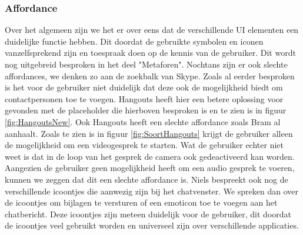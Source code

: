 \documentclass[11pt]{article}
\begin{document}
\subsubsection{Affordance} 
Over het algemeen zijn we het er over eens dat de verschillende UI elementen een duidelijke functie hebben. Dit doordat de gebruikte symbolen en iconen vanzelfsprekend zijn en toespraak doen op de kennis van de gebruiker. Dit wordt nog uitgebreid besproken in het deel "Metaforen". 
\newline
Nochtans zijn er ook slechte affordances, we denken zo aan de zoekbalk van Skype. Zoals al eerder besproken is het voor de gebruiker niet duidelijk dat deze ook de mogelijkheid biedt om contactpersonen toe te voegen. Hangouts heeft hier een betere oplossing voor gevonden met de placeholder die hierboven besproken is en te zien is in figuur \ref{fig:HangoutsNew}.
\newline
Ook Hangouts heeft een slechte affordance zoals Bram al aanhaalt. Zoals te zien is in figuur \ref{fig:SoortHangouts} krijgt de gebruiker alleen de mogelijkheid om een videogesprek te starten. Wat de gebruiker echter niet weet is dat in de loop van het gesprek de camera ook gedeactiveerd kan worden. Aangezien de gebruiker geen mogelijkheid heeft om een audio gesprek te voeren, kunnen we zeggen dat dit een slechte affordance is. 
\newline  
Niels bespreekt ook nog de verschillende icoontjes die aanwezig zijn bij het chatvenster. We spreken dan over de icoontjes om bijlagen te versturen of een emoticon toe te voegen aan het chatbericht. Deze icoontjes zijn meteen duidelijk voor de gebruiker, dit doordat de icoontjes veel gebruikt worden en universeel zijn over verschillende applicaties.

\newpage
\end{document}
